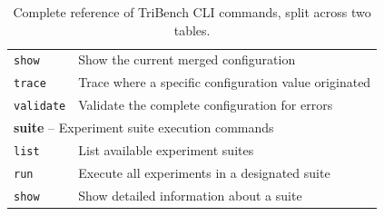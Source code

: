 \begin{table}[H]
\begin{tabular}{p{2.5cm}p{11.5cm}}
\texttt{show}      & Show the current merged configuration \\
\texttt{trace}     & Trace where a specific configuration value originated \\
\texttt{validate}  & Validate the complete configuration for errors \\
\hline
\multicolumn{2}{l}{\textbf{suite} -- Experiment suite execution commands} \\
\hline
\texttt{list}      & List available experiment suites \\
\texttt{run}       & Execute all experiments in a designated suite \\
\texttt{show}      & Show detailed information about a suite \\
\hline
\end{tabular}
\caption{Complete reference of TriBench CLI commands, split across two tables.}
\label{tab:full_cli_reference}
\end{table}
